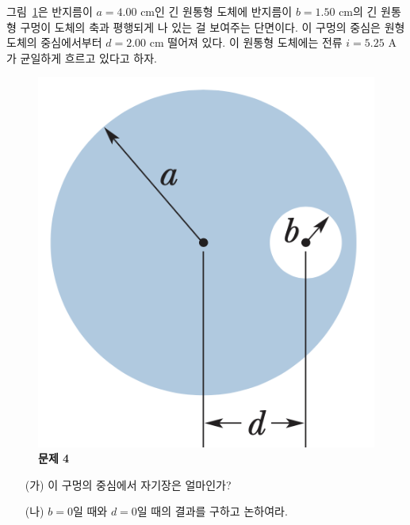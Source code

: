 \documentclass[tightenlines,floatfix,nofootinbib,superscriptaddress,fleqn]{revtex4}
\begin{document}
그림~\ref{fig:4}은 반지름이 $a=4.00$ cm인 긴 원통형 도체에 반지름이
$b=1.50$ cm의 긴 원통형 구멍이 도체의 축과 평행되게 나 있는 걸
보여주는 단면이다.  이 구멍의 중심은 원형 도체의 중심에서부터 $d=2.00$
cm 떨어져 있다. 이 원통형 도체에는 전류 $i=5.25$ A가 균일하게 흐르고
있다고 하자. 
\begin{figure}[htp]
  \centering
  \includegraphics[scale=0.55]{qfig10-3.png}
  \caption{\textbf{문제 4}}
  \label{fig:4}
\end{figure}
\begin{itemize}
\item[(가)] 이 구멍의 중심에서 자기장은 얼마인가?
\item[(나)] $b=0$일 때와 $d=0$일 때의 결과를 구하고 논하여라. 
\end{itemize}

\vspace{1cm}
\vspace{1cm}
\end{document}

